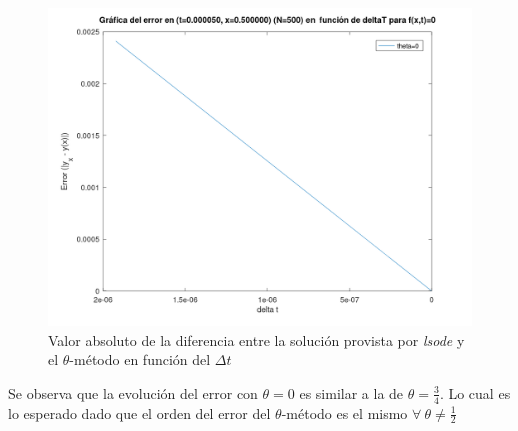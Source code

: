 \documentclass{endm}
\begin{document}
\begin{figure}[H]
    \centering
    \includegraphics[scale=0.4]{e_t0.png}
    \caption{Valor absoluto de la diferencia entre la solución provista por \textit{lsode} y el $\theta$-método en función del $\Delta t$}
    \label{fig:snipf0}
\end{figure}
Se observa que la evolución del error con $\theta=0$ es similar a la de $\theta=\frac{3}{4}$. Lo cual es lo esperado dado que el orden del error del $\theta$-método es el mismo $\forall \ \theta \neq \frac{1}{2}$
\clearpage
\end{document}
